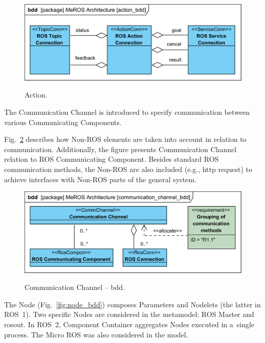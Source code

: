 \documentclass[11pt,oneside,a4paper]{report}
\begin{document}
	\begin{figure}[hbt]
		\centering
		\begin{center}
			{\includegraphics[scale=1.0]{diagrams/action_bdd.png}}
		\end{center}
		\caption{Action.} 
		\label{fig:action_bdd}
	\end{figure}
	
	\pagebreak
	
	The Communication Channel is introduced to specify communication between various Communicating Components.
	
	Fig.~\ref{fig:communication_channel_bdd} describes how Non-ROS elements are taken into account in relation to communication. Additionally, the figure presents Communication Channel relation to ROS Communicating Component. Besides standard ROS communication methods, the Non-ROS are also included (e.g., http request) to achieve interfaces with Non-ROS parts of the general system. 
	

	\begin{figure}[H]
		\centering
		\begin{center}
			{\includegraphics[scale=1.0]{diagrams/communication_channel_bdd.png}}
		\end{center}
		\caption{Communication Channel -- bdd.} 
		\label{fig:communication_channel_bdd}
	\end{figure}
	

	\pagebreak
		 
 	The Node (Fig.~\ref{fig:node_bdd}) composes Parameters and Nodelets (the latter in ROS~1). Two specific Nodes are considered in the metamodel: ROS Master and rosout. In ROS~2, Component Container aggregates Nodes executed in a~single process. The Micro ROS was also considered in the model. 
 	
\end{document}
